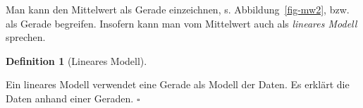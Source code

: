 \documentclass[
  letterpaper,
  oneside,
  open=any]{scrbook}
\theoremstyle{definition}
\theoremstyle{definition}
\theoremstyle{definition}
\newtheorem{definition}{Definition}[chapter]
\theoremstyle{remark}
\begin{document}
Man kann den Mittelwert als Gerade einzeichnen, s.
Abbildung~\ref{fig-mw2}, bzw. als Gerade begreifen. Insofern kann man
vom Mittelwert auch als \emph{lineares Modell} sprechen.

\begin{definition}[Lineares
Modell]\protect\hypertarget{def-lm}{}\label{def-lm}

Ein lineares Modell verwendet eine Gerade als Modell der Daten. Es
erklärt die Daten anhand einer Geraden. \(\square\)

\end{definition}

\begin{figure}

\begin{minipage}{0.50\linewidth}



\end{minipage}%
%
\begin{minipage}{0.50\linewidth}

\end{minipage}
\end{figure}
\end{document}

